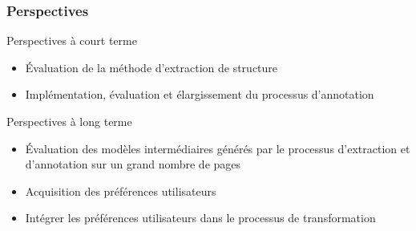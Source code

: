 \documentclass[9pt]{beamer}
\begin{document}
\begin{frame}
	\frametitle{Perspectives}
		\begin{block}{Perspectives à court terme}
		\begin{itemize}
			\item Évaluation de la méthode d'extraction de structure
			\item Implémentation, évaluation et élargissement du processus d'annotation
		\end{itemize}
	\end{block}
	\begin{block}{Perspectives à long terme}
		\begin{itemize}
			\item Évaluation des modèles intermédiaires générés par le processus d'extraction et d'annotation sur un grand nombre de pages 
			\item Acquisition des préférences utilisateurs
			\item Intégrer les préférences utilisateurs dans le processus de transformation
		\end{itemize}
	\end{block}
\end{frame}
 
\end{document}
